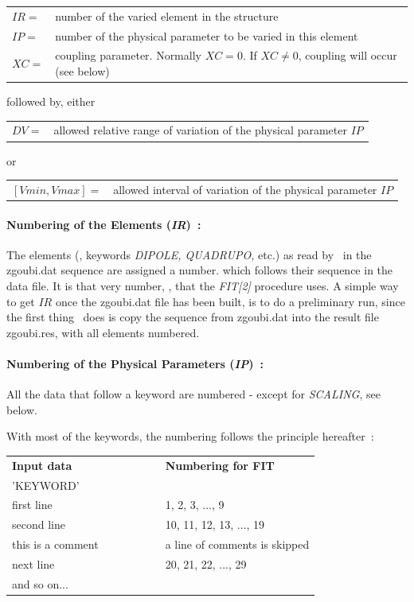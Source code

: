 \begin{tabular}{ll}
$ IR = $ &number of the varied element in the structure \\
$ IP =  $ &number of the physical parameter to be varied in this element \\
$ XC =  $ &coupling parameter. Normally $ XC=0$.  If $ XC\not= 0$, coupling will occur (see below) \\
\end{tabular} 

\noindent followed by, either 

\begin{tabular}{ll}
$ DV = $ &allowed relative range of variation of the physical parameter $ IP $
\end{tabular}

\noindent or 

\begin{tabular}{ll}
$ [Vmin,Vmax] = $ &allowed interval of variation of the physical parameter $ IP $
\end{tabular}



\paragraph{Numbering of the Elements (\textsl{IR})~: } 

\noindent The elements (\ie, keywords \textsl{DIPOLE, QUADRUPO,} etc.) 
as read by \zgoubi\ in the zgoubi.dat sequence are assigned a number.  which follows 
 their sequence in the  data file.  It  is that very number, \IR, that 
the \textsl{FIT[2]} procedure uses. 
A simple way to get $ IR $ once the zgoubi.dat file has been built, is to do a preliminary run, 
since the first thing  \zgou\ does is 
copy the sequence from zgoubi.dat  into the result file  zgoubi.res,  with all elements numbered.  

\paragraph{Numbering of the Physical Parameters (\textsl{IP})~: }

\noindent All the data that follow a keyword are numbered -  except for \textsl{SCALING}, see below. 

\noindent With most of the keywords, the numbering follows the principle hereafter~: 
\begin{center}
{\renewcommand{\arraystretch}{1}
	\begin{tabular}{lcl}
	\textbf{Input  data}  &~~~~~~~~&  \textbf{Numbering  for  FIT}\\[1ex]
	'KEYWORD'      &&  \\
	first line   && 1, 2, 3, ..., 9 \\
	second  line &&  10, 11, 12, 13, ..., 19 \\
	this  is  a  comment &&  a line of comments is skipped\\
	next line    && 20, 21, 22, ..., 29  \\
	and  so  on... && 
	\end{tabular}    }
\end{center}

